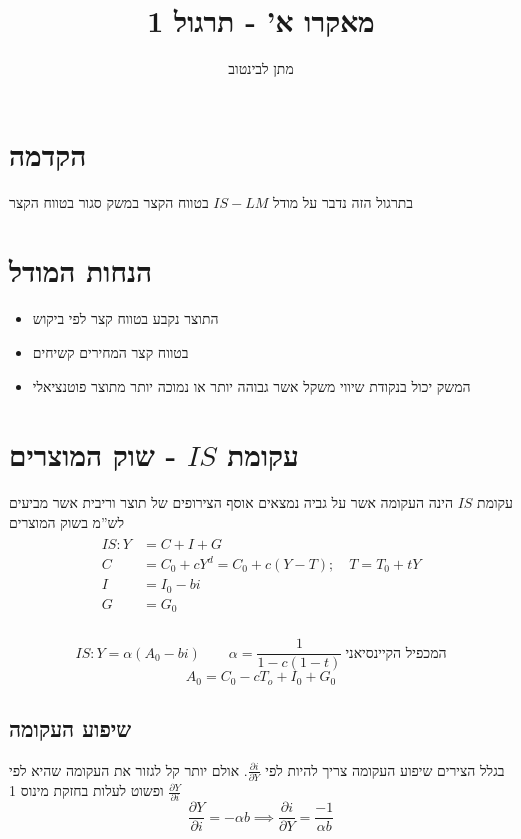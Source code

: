 \documentclass[a4paper,11pt]{article}
\title{מאקרו א' - תרגול 1}
\author{מתן לבינטוב}
\date{}
\begin{document}
\begin{RTL}
    
\maketitle
\section{הקדמה}
בתרגול הזה נדבר על מודל $IS-LM$  בטווח הקצר במשק סגור בטווח הקצר
\section{הנחות המודל}
\begin{itemize}
    \item התוצר נקבע בטווח קצר לפי ביקוש
    \item בטווח קצר המחירים קשיחים
    \item המשק יכול בנקודת שיווי משקל אשר גבוהה יותר או נמוכה יותר מתוצר פוטנציאלי
\end{itemize}
\section{עקומת $IS$ - שוק המוצרים}
עקומת $IS$ הינה העקומה אשר על גביה נמצאים אוסף הצירופים של תוצר וריבית אשר מביעים לש''מ בשוק המוצרים
\begin{align*}
    \begin{split}
        IS : Y &= C + I + G \\
        C & = C_0 + cY^d = C_0  + c\left( Y-T \right)  ; \quad T = T_0 + tY \\
        I & =   I_0 - bi \\ 
        G &= G_0 \\ 
    \end{split}
\end{align*}

\begin{equation*}
    IS : Y = \alpha \left( A_0 - bi \right) \qquad \alpha = \frac{1}{1-c(1-t)} \: \text{המכפיל הקיינסיאני}
\end{equation*}
\begin{equation*}
    A_0 = C_0 - cT_o + I_0 + G_0
\end{equation*}

\subsection{שיפוע העקומה}
בגלל הצירים שיפוע העקומה צריך להיות לפי $\frac{\partial i}{\partial Y}$.
אולם יותר קל לגזור את העקומה שהיא לפי $\frac{\partial Y}{\partial i}$ ופשוט לעלות בחזקת מינוס 1
\begin{equation*}
    \frac{\partial Y}{\partial i} = - \alpha b \implies \frac{\partial i}{\partial Y } = \frac{-1}{\alpha b}
 \end{equation*}


\end{RTL}
\end{document}
